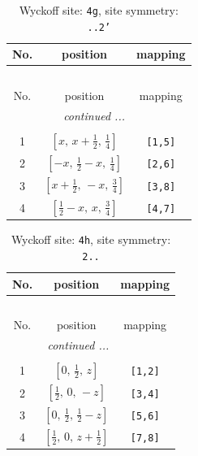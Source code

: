 \documentclass[fleqn,8pt]{jsarticle}
\begin{document}
\renewcommand{\arraystretch}{1.2}
\begin{longtable}{ccc}
\caption{Wyckoff site: {\tt 4g}, site symmetry: {\tt ..2'}}
 \\
 \hline \hline
No. & position & mapping \\ \hline \endfirsthead

\multicolumn{2}{l}{\tablename\ \thetable{}} \\
 \hline \hline
No. & position & mapping \\ \hline \endhead

 \hline \hline
\multicolumn{2}{r}{\footnotesize\it continued ...} \\ \endfoot

 \hline \hline
\multicolumn{2}{r}{} \\ \endlastfoot

1 & $\left[ x,\, x + \frac{1}{2},\, \frac{1}{4} \right]$ & {\tt [1,5]} \\ \hline
2 & $\left[ - x,\, \frac{1}{2} - x,\, \frac{1}{4} \right]$ & {\tt [2,6]} \\ \hline
3 & $\left[ x + \frac{1}{2},\, - x,\, \frac{3}{4} \right]$ & {\tt [3,8]} \\ \hline
4 & $\left[ \frac{1}{2} - x,\, x,\, \frac{3}{4} \right]$ & {\tt [4,7]} \\
\end{longtable}
\renewcommand{\arraystretch}{1.2}
\begin{longtable}{ccc}
\caption{Wyckoff site: {\tt 4h}, site symmetry: {\tt 2..}}
 \\
 \hline \hline
No. & position & mapping \\ \hline \endfirsthead

\multicolumn{2}{l}{\tablename\ \thetable{}} \\
 \hline \hline
No. & position & mapping \\ \hline \endhead

 \hline \hline
\multicolumn{2}{r}{\footnotesize\it continued ...} \\ \endfoot

 \hline \hline
\multicolumn{2}{r}{} \\ \endlastfoot

1 & $\left[ 0,\, \frac{1}{2},\, z \right]$ & {\tt [1,2]} \\ \hline
2 & $\left[ \frac{1}{2},\, 0,\, - z \right]$ & {\tt [3,4]} \\ \hline
3 & $\left[ 0,\, \frac{1}{2},\, \frac{1}{2} - z \right]$ & {\tt [5,6]} \\ \hline
4 & $\left[ \frac{1}{2},\, 0,\, z + \frac{1}{2} \right]$ & {\tt [7,8]} \\
\end{longtable}
\end{document}
